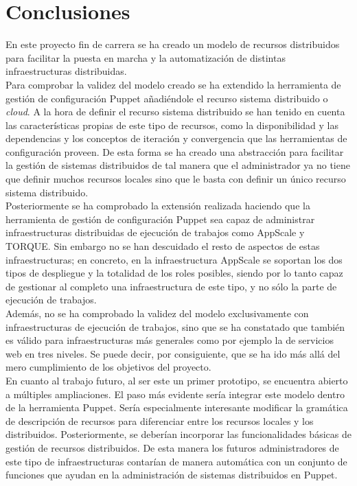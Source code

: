 \chapter{Conclusiones}
\label{cap:conclusiones}


En este proyecto fin de carrera se ha creado un modelo de recursos distribuidos para facilitar la puesta en marcha y la automatización de distintas infraestructuras distribuidas. \\

Para comprobar la validez del modelo creado se ha extendido la herramienta de gestión de configuración Puppet añadiéndole el recurso sistema distribuido o \emph{cloud}. A la hora de definir el recurso sistema distribuido se han tenido en cuenta las características propias de este tipo de recursos, como la disponibilidad y las dependencias y los conceptos de iteración y convergencia que las herramientas de configuración proveen. De esta forma se ha creado una abstracción para facilitar la gestión de sistemas distribuidos de tal manera que el administrador ya no tiene que definir muchos recursos locales sino que le basta con definir un único recurso sistema distribuido. \\

Posteriormente se ha comprobado la extensión realizada haciendo que la herramienta de gestión de configuración Puppet sea capaz de administrar infraestructuras distribuidas de ejecución de trabajos como AppScale y TORQUE. Sin embargo no se han descuidado el resto de aspectos de estas infraestructuras; en concreto, en la infraestructura AppScale se soportan los dos tipos de despliegue y la totalidad de los roles posibles, siendo por lo tanto capaz de gestionar al completo una infraestructura de este tipo, y no sólo la parte de ejecución de trabajos. \\

Además, no se ha comprobado la validez del modelo exclusivamente con infraestructuras de ejecución de trabajos, sino que se ha constatado que también es válido para infraestructuras más generales como por ejemplo la de servicios web en tres niveles. Se puede decir, por consiguiente, que se ha ido más allá del mero cumplimiento de los objetivos del proyecto. \\

En cuanto al trabajo futuro, al ser este un primer prototipo, se encuentra abierto a múltiples ampliaciones. El paso más evidente sería integrar este modelo dentro de la herramienta Puppet. Sería especialmente interesante modificar la gramática de descripción de recursos para diferenciar entre los recursos locales y los distribuidos. Posteriormente, se deberían incorporar las funcionalidades básicas de gestión de recursos distribuidos. De esta manera los futuros administradores de este tipo de infraestructuras contarían de manera automática con un conjunto de funciones que ayudan en la administración de sistemas distribuidos en Puppet.

